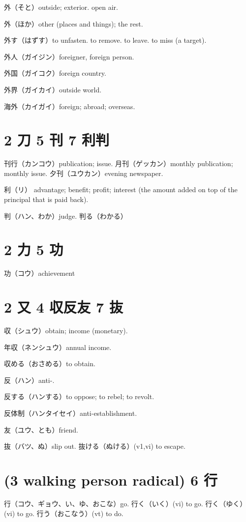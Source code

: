 外（そと）outside; exterior. open air.

外（ほか）other (places and things); the rest.

外す（はずす）to unfasten. to remove. to leave. to miss (a target).

外人（ガイジン）foreigner, foreign person.

外国（ガイコク）foreign country.

外界（ガイカイ）outside world.

海外（カイガイ）foreign; abroad; overseas.

\section{2 刀 5 刊 7 利判}

刊行（カンコウ）publication; issue.
月刊（ゲッカン）monthly publication; monthly issue.
夕刊（ユウカン）evening newspaper.

利（リ）
advantage; benefit; profit;
interest (the amount added on top of the principal that is paid back).

判（ハン、わか）judge.
判る（わかる）

\section{2 力 5 功}

功（コウ）achievement

\section{2 又 4 収反友 7 抜}

収（シュウ）obtain; income (monetary).

年収（ネンシュウ）annual income.

収める（おさめる）to obtain.

反（ハン）anti-.

反する（ハンする）to oppose; to rebel; to revolt.

反体制（ハンタイセイ）anti-establishment.

友（ユウ、とも）friend.

抜（バツ、ぬ）slip out.
抜ける（ぬける）(v1,vi) to escape.

\section{(3 walking person radical) 6 行}

行（コウ、ギョウ、い、ゆ、おこな）go.
行く（いく）(vi) to go.
行く（ゆく）(vi) to go.
行う（おこなう）(vt) to do.

